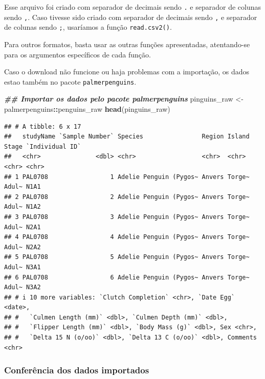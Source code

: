 \documentclass[
]{article}
\newenvironment{Shaded}{\begin{snugshade}}{\end{snugshade}}
\newcommand{\DocumentationTok}[1]{\textcolor[rgb]{0.56,0.35,0.01}{\textbf{\textit{#1}}}}
\newcommand{\FunctionTok}[1]{\textcolor[rgb]{0.13,0.29,0.53}{\textbf{#1}}}
\newcommand{\NormalTok}[1]{#1}
\newcommand{\OtherTok}[1]{\textcolor[rgb]{0.56,0.35,0.01}{#1}}
\newcommand{\SpecialCharTok}[1]{\textcolor[rgb]{0.81,0.36,0.00}{\textbf{#1}}}
\begin{document}
Esse arquivo foi criado com separador de decimais sendo \texttt{.} e separador de colunas sendo \texttt{,}. Caso tivesse sido criado com separador de decimais sendo \texttt{,} e separador de colunas sendo \texttt{;}, usaríamos a função \texttt{read.csv2()}.

Para outros formatos, basta usar as outras funções apresentadas, atentando-se para os argumentos específicos de cada função.

Caso o download não funcione ou haja problemas com a importação, os dados estao também no pacote \texttt{palmerpenguins}.

\begin{Shaded}
\begin{Highlighting}[]
\DocumentationTok{\#\# Importar os dados pelo pacote palmerpenguins}
\NormalTok{pinguins\_raw }\OtherTok{\textless{}{-}}\NormalTok{ palmerpenguins}\SpecialCharTok{::}\NormalTok{penguins\_raw}
\FunctionTok{head}\NormalTok{(pinguins\_raw)}
\end{Highlighting}
\end{Shaded}

\begin{verbatim}
## # A tibble: 6 x 17
##   studyName `Sample Number` Species                Region Island Stage `Individual ID`
##   <chr>               <dbl> <chr>                  <chr>  <chr>  <chr> <chr>          
## 1 PAL0708                 1 Adelie Penguin (Pygos~ Anvers Torge~ Adul~ N1A1           
## 2 PAL0708                 2 Adelie Penguin (Pygos~ Anvers Torge~ Adul~ N1A2           
## 3 PAL0708                 3 Adelie Penguin (Pygos~ Anvers Torge~ Adul~ N2A1           
## 4 PAL0708                 4 Adelie Penguin (Pygos~ Anvers Torge~ Adul~ N2A2           
## 5 PAL0708                 5 Adelie Penguin (Pygos~ Anvers Torge~ Adul~ N3A1           
## 6 PAL0708                 6 Adelie Penguin (Pygos~ Anvers Torge~ Adul~ N3A2           
## # i 10 more variables: `Clutch Completion` <chr>, `Date Egg` <date>,
## #   `Culmen Length (mm)` <dbl>, `Culmen Depth (mm)` <dbl>,
## #   `Flipper Length (mm)` <dbl>, `Body Mass (g)` <dbl>, Sex <chr>,
## #   `Delta 15 N (o/oo)` <dbl>, `Delta 13 C (o/oo)` <dbl>, Comments <chr>
\end{verbatim}

\hypertarget{conferuxeancia-dos-dados-importados}{%
\subsubsection{Conferência dos dados importados}\label{conferuxeancia-dos-dados-importados}}
\end{document}
